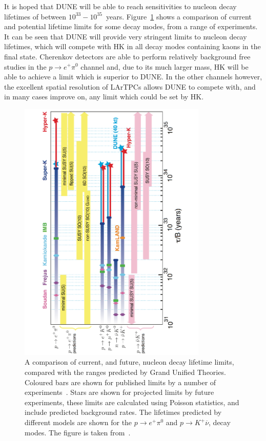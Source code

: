 It is hoped that DUNE will be able to reach sensitivities to nucleon decay lifetimes of between $10^{33}-10^{35}$~years. Figure~\ref{fig:DUNE_NDK_Lifetime} shows a comparison of current and potential lifetime limits for some decay modes, from a range of experiments. It can be seen that DUNE will provide very stringent limits to nucleon decay lifetimes, which will compete with HK in all decay modes containing kaons in the final state. Cherenkov detectors are able to perform relatively background free studies in the $p \rightarrow e^{+} \pi^{0}$ channel and, due to its much larger mass, HK will be able to achieve a limit which is superior to DUNE. In the other channels however, the excellent spatial resolution of LArTPCs allows DUNE to compete with, and in many cases improve on, any limit which could be set by HK. \\

\begin{figure}
  \centering
  \includegraphics[width=0.8\textwidth]{NucleonDecayLimits}
  \caption[A comparison of current, and future, nucleon decay lifetime limits, compared with the ranges predicted by Grand Unified Theories.]
          {A comparison of current, and future, nucleon decay lifetime limits, compared with the ranges predicted by Grand Unified Theories. Coloured bars are shown for published limits by a number of experiments~\citep{PDG2012, Nishino:2012bnw}. Stars are shown for projected limits by future experiments, these limits are calculated using Poisson statistics, and include predicted background rates. The lifetimes predicted by different models are shown for the $p \rightarrow e^{+} \pi^{0}$ and $p \rightarrow K^{+} \overline{\nu}$, decay modes. The figure is taken from~\citep{DUNECDR_V2}.}
  \label{fig:DUNE_NDK_Lifetime}
\end{figure}

